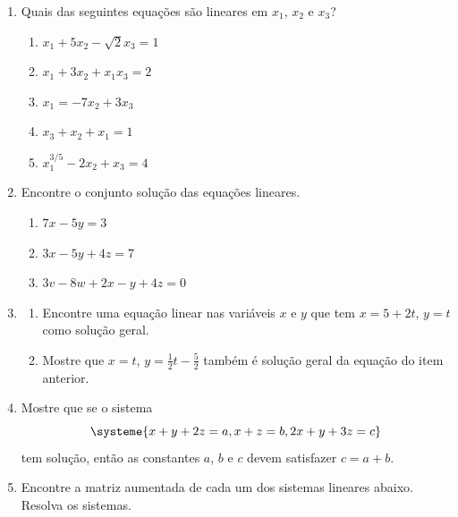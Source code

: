 \documentclass[a4paper,5pt]{amsbook}
\begin{document}
\begin{enumerate}
	\vspace{0.5cm}
	\item Quais das seguintes equa\c{c}\~oes s\~ao lineares em $x_1$, $x_2$ e $x_3$?
		\begin{enumerate}
			\item $x_1+5x_2-\sqrt{2}x_3=1$
			\item $x_1+3x_2+x_1x_3=2$
			\item $x_1 = -7x_2+3x_3$
			\item $x_3+x_2+x_1 = 1$
            \item $x_1^{3/5}-2x_2+x_3=4$
		\end{enumerate}

	\vspace{0.5cm}
	\item Encontre o conjunto solu\c{c}\~ao das equa\c{c}\~oes lineares.
		\begin{enumerate}
			\item $7x-5y=3$
			\item $3x-5y+4z=7$
            \item $3v-8w+2x-y+4z=0$
		\end{enumerate}

	\vspace{0.5cm}
	\item 
        \begin{enumerate}
            \item Encontre uma equa\c{c}\~ao linear nas vari\'aveis $x$ e $y$ que tem
                $x=5+2t$, $y=t$ como solu\c{c}\~ao geral.
            \item Mostre que $x=t$, $y=\frac{1}{2}t-\frac{5}{2}$ tamb\'em \'e
                solu\c{c}\~ao geral da equa\c{c}\~ao do item anterior.
        \end{enumerate}

	\vspace{0.5cm}
	\item Mostre que se o sistema
		\[\systeme{
				x+y+2z=a,
				x+z=b,
				2x+y+3z=c}\]
	tem solu\c{c}\~ao, ent\~ao as constantes $a$, $b$ e $c$ devem satisfazer $c = a+b$.

	\vspace{0.5cm}
    \item Encontre a matriz aumentada de cada um dos sistemas lineares abaixo.
        Resolva os sistemas.

		\vspace{0.3cm}


\end{enumerate}
\end{document}
